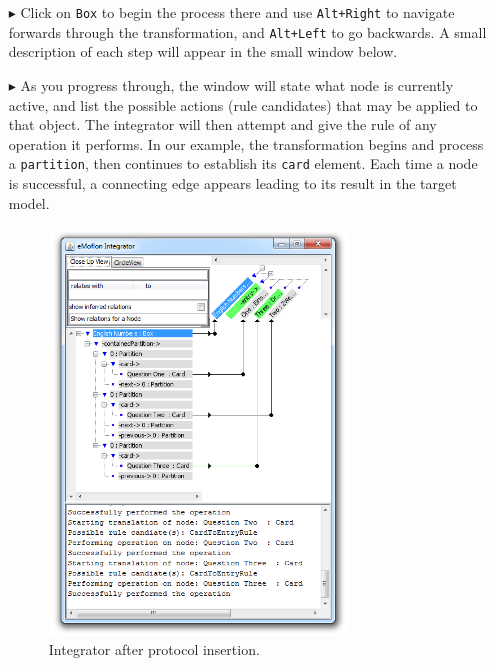 \begin{itemize}
\item[$\blacktriangleright$]  Click on \texttt{Box} to begin the process there and use \texttt{Alt+Right} to navigate forwards through the
transformation, and \texttt{Alt+Left} to go backwards. A small description of each step will appear in the small window below.

\item[$\blacktriangleright$] As you progress through, the window will state what node is currently active, and list the possible actions (rule candidates) that
may be applied to that object. The integrator will then attempt and give the rule of any operation it performs. In our example, the transformation begins and
process a \texttt{partition}, then continues to establish its \texttt{card} element. Each time a node is successful, a connecting edge appears leading to its
result in the target model. 

\vspace{0.5cm}

\begin{figure}[h!]
\begin{center}
  \includegraphics[width=0.75\textwidth]{eclipse_integratorPerformed}
  \caption{Integrator after protocol insertion.}
  \label{fig:integrator_after_protocol}
\end{center}
\end{figure} 


\end{itemize}
